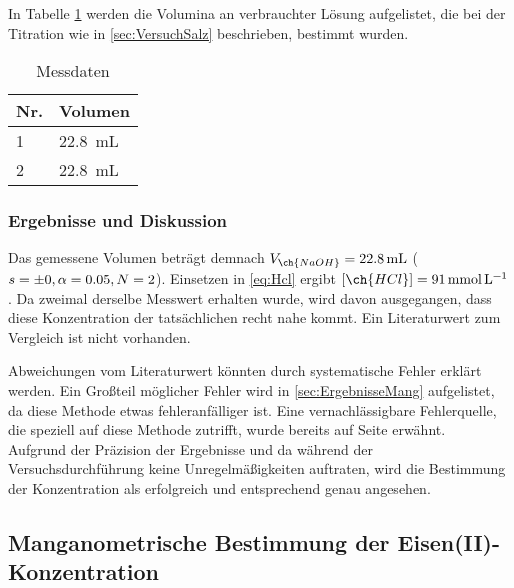 \documentclass{article}
\begin{document}
        In Tabelle \ref{tab:MessdatenSalz} werden die Volumina an verbrauchter  Lösung aufgelistet, die bei der Titration wie in \ref{sec:VersuchSalz} beschrieben, bestimmt wurden. 
        
        \begin{table}[H]
          \centering
          \caption[Messdaten der Bestimmung der Konzentration einer Salzsäure, Quelle: Autor]{Messdaten}
          \label{tab:MessdatenSalz}
            \begin{tabular}{@{}l|l@{}}
              \toprule
               Nr. & Volumen \\ \midrule
               1 & \SI[mode=text]{22.8}{\milli\liter} \\
               2 & \SI[mode=text]{22.8}{\milli\liter} \\ \bottomrule
            \end{tabular}
        \end{table} 
        
      \subsubsection{Ergebnisse und Diskussion} \label{sec:ErgebnisseHCLzz}
        
        Das gemessene Volumen beträgt demnach $V_{\ch{NaOH}} = \SI[mode=text]{22.8}{\milli\liter}$ ($s = \num{\pm 0}, \alpha=0.05,N=2$). Einsetzen in \eqref{eq:Hcl} ergibt $[\ch{HCl}] = \SI[mode=text]{91}{\milli\mole\per\liter}$. Da zweimal derselbe Messwert erhalten wurde, wird davon ausgegangen, dass diese Konzentration der tatsächlichen recht nahe kommt. Ein Literaturwert zum Vergleich ist nicht vorhanden. 
        
        Abweichungen vom Literaturwert könnten durch systematische Fehler erklärt werden. Ein Großteil möglicher Fehler wird in \ref{sec:ErgebnisseMang} aufgelistet, da diese Methode etwas fehleranfälliger ist. Eine vernachlässigbare Fehlerquelle, die speziell auf diese Methode zutrifft, wurde bereits auf Seite \pageref{seite} erwähnt. \\
        
        Aufgrund der Präzision der Ergebnisse und da während der Versuchsdurchführung keine Unregelmäßigkeiten auftraten, wird die Bestimmung der  Konzentration als erfolgreich und entsprechend genau angesehen. 
        
    \pagebreak
    
    \subsection{Manganometrische Bestimmung der Eisen(II)-Konzentration}
        
\end{document}
